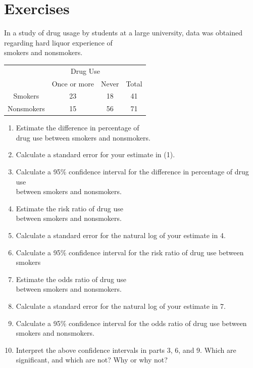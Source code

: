 \documentclass[11pt, chapterprefix=true]{scrbook}\usepackage[]{graphicx}\usepackage[]{color}
\begin{document}
\section{Exercises}
\begin{exercises}

  \begin{exercise}  %

In a study of drug usage by students at a large university, data was obtained regarding hard liquor experience of \\ smokers and  nonsmokers.

\begin{table}[ht]
\centering
\begin{tabular}{@{} cccc @{}} \hline
 & \multicolumn{2}{c}{Drug Use} \\
 & Once or more & Never & Total \\ \hline
Smokers & 23 & 18 & 41 \\
Nonsmokers & 15 & 56 & 71 \\ \hline
\end{tabular}
\end{table}

\begin{enumerate}
\item Estimate the difference in percentage of \\ drug use between smokers and nonsmokers.
\item Calculate a standard error for your estimate in (1).
\item Calculate a 95\% confidence interval for the difference in percentage of drug use \\ between smokers and nonsmokers.
\item Estimate the risk ratio of drug use \\ between smokers and nonsmokers.
\item Calculate a standard error for the natural log of your estimate in 4.
\item Calculate a 95\% confidence interval for the risk ratio of drug use between smokers
\item Estimate the odds ratio of drug use \\ between smokers and nonsmokers.
\item Calculate a standard error for the natural log of your estimate in 7.
\item Calculate a 95\% confidence interval for the odds ratio of drug use  between \\ smokers and nonsmokers.
\item Interpret the above confidence intervals in parts 3, 6, and 9. Which are significant, and which are not? Why or why not?
\end{enumerate}
  \end{exercise}
  \begin{solution}  %




\end{solution}
\end{exercises}
\end{document}
